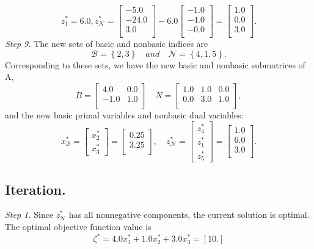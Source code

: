 \documentclass [12pt] {article}
\begin{document}
\[
z^*_1 = 6.0,        z^*_{\mathcal N} = 
\begin{bmatrix} -5.0 \\ -24.0 \\ 3.0 \\ \end{bmatrix} - 6.0 \begin{bmatrix} -1.0 \\ -4.0 \\ -0.0 \\ \end{bmatrix} = \begin{bmatrix} 1.0 \\ 0.0 \\ 3.0 \\ \end{bmatrix} .
\]
\textit{Step 9.} The new sets of basic and nonbasic indices are
\[
{\mathcal B} = \left \{ 2, 3 \right \}  \quad
and    \quad
{\mathcal N} = \left \{ 4, 1, 5 \right \}.
\]
Corresponding to these sets, we have the new basic and nonbasic submatrices of A,
\[
B = \begin{bmatrix} 4.0 & 0.0 \\ -1.0 & 1.0 \\ \end{bmatrix}  \quad
N = \begin{bmatrix} 1.0 & 1.0 & 0.0 \\ 0.0 & 3.0 & 1.0 \\ \end{bmatrix},
\]
and the new basic primal variables and nonbasic dual variables:
\[
 x^*_{\mathcal B} = 
\begin{bmatrix} x^*_2 \\ x^*_3 \end{bmatrix} = \begin{bmatrix} 0.25 \\ 3.25 \\ \end{bmatrix} ,   \quad
z^*_{\mathcal N} = 
\begin{bmatrix} z^*_4 \\ z^*_1 \\ z^*_5 \end{bmatrix} = \begin{bmatrix} 1.0 \\ 6.0 \\ 3.0 \\ \end{bmatrix}.
\]

\subsection{  Iteration.}
\textit{Step 1. } Since \textit{z}$^*_{\mathcal N}$ has all nonnegative components, the current solution is optimal. The optimal objective function value is
\[
\zeta^* = 4.0x^*_1  +  1.0x^*_2  +  3.0x^*_3 = [ 10.]
\]
\end{document}
